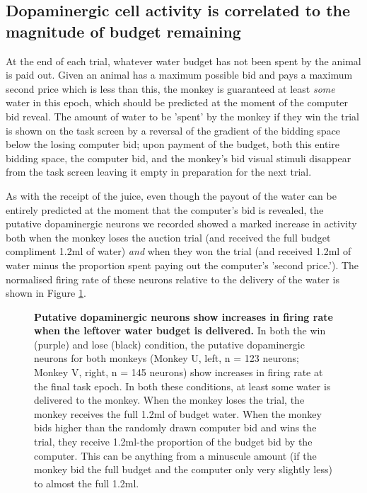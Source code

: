 \subsection{Dopaminergic cell activity is correlated to the magnitude of budget remaining}

At the end of each trial, whatever water budget has not been spent by the animal is paid out. Given an animal has a maximum possible bid and pays a maximum second price which is less than this, the monkey is guaranteed at least \textit{some} water in this epoch, which should be predicted at the moment of the computer bid reveal. The amount of water to be 'spent' by the monkey if they win the trial is shown on the task screen by a reversal of the gradient of the bidding space below the losing computer bid; upon payment of the budget, both this entire bidding space, the computer bid, and the monkey's bid visual stimuli disappear from the task screen leaving it empty in preparation for the next trial.

As with the receipt of the juice, even though the payout of the water can be entirely predicted at the moment that the computer's bid is revealed, the putative dopaminergic neurons we recorded showed a marked increase in activity both when the monkey loses the auction trial (and received the full budget compliment 1.2ml of water) \textit{and} when they won the trial (and received 1.2ml of water minus the proportion spent paying out the computer's 'second price.'). The normalised firing rate of these neurons relative to the delivery of the water is shown in Figure \ref{fig:water_delivery_fig}.

\begin{figure}[htbp!] 
\centering    

\caption[Putative dopaminergic neurons show increases in firing rate when the leftover water budget is delivered.]{\textbf{Putative dopaminergic neurons show increases in firing rate when the leftover water budget is delivered.} In both the win (purple) and lose (black) condition, the putative dopaminergic neurons for both monkeys (Monkey U, left, n = 123 neurons; Monkey V, right, n = 145 neurons) show increases in firing rate at the final task epoch. In both these conditions, at least some water is delivered to the monkey. When the monkey loses the trial, the monkey receives the full 1.2ml of budget water. When the monkey bids higher than the randomly drawn computer bid and wins the trial, they receive 1.2ml-the proportion of the budget bid by the computer. This can be anything from a minuscule amount (if the monkey bid the full budget and the computer only very slightly less) to almost the full 1.2ml.}
\label{fig:water_delivery_fig}
\end{figure}

